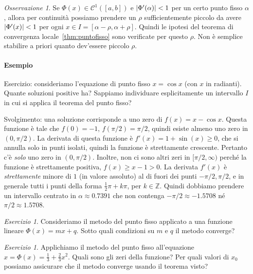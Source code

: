 \documentclass[a4paper]{report}
\DeclarePairedDelimiter{\abs}{\lvert}{\rvert}
\theoremstyle{definiton}
\theoremstyle{remark}
\newtheorem{remark}[theorem]{Osservazione}
\newtheorem{esercizio}[theorem]{Esercizio}
\begin{document}
\begin{remark} \label{oss:corpuntofisso}
Se $\Phi(x) \in \mathcal{C}^1([a,b])$ e $\abs{\Phi'(\alpha)} < 1$ per un certo punto fisso $\alpha$, allora per continuità possiamo prendere un $\rho$ sufficientemente piccolo da avere $\abs{\Phi'(x)} < 1$ per ogni $x \in I = [\alpha - \rho, \alpha + \rho]$. Quindi le ipotesi del teorema di convergenza locale~\ref{thm:puntofisso} sono verificate per questo $\rho$. Non è semplice stabilire a priori quanto dev'essere piccolo $\rho$.
\end{remark}

\paragraph{Esempio}

Esercizio: consideriamo l'equazione di punto fisso $x = \cos x$ (con $x$ in radianti). Quante soluzioni positive ha? Sappiamo individuare esplicitamente un intervallo $I$ in cui si applica il teorema del punto fisso?


Svolgimento: una soluzione corrisponde a uno zero di $f(x) = x - \cos x$. Questa funzione è tale che $f(0) = -1$, $f(\pi/2) = \pi/2$, quindi esiste almeno uno zero in $(0,\pi/2)$. La derivata di questa funzione è $f'(x) = 1 + \sin(x) \geq 0$, che si annulla solo in punti isolati, quindi la funzione è strettamente crescente. Pertanto c'è \emph{solo} uno zero in $(0,\pi/2)$. Inoltre, non ci sono altri zeri in $[\pi/2, \infty)$ perché la funzione è strettamente positiva, $f(x) \geq x - 1 > 0$. La derivata $f'(x)$ è \emph{strettamente} minore di $1$ (in valore assoluto) al di fuori dei punti $-\pi/2, \pi/2$, e in generale tutti i punti della forma $\frac12 \pi + k\pi$, per $k\in\mathbb{Z}$. Quindi dobbiamo prendere un intervallo centrato in $\alpha \approx 0.7391$ che non contenga $-\pi/2 \approx -1.5708$ né $\pi/2 \approx 1.5708$.

\begin{esercizio}
    Consideriamo il metodo del punto fisso applicato a una funzione lineare $\Phi(x) = mx + q$. Sotto quali condizioni su $m$ e $q$ il metodo converge?
\end{esercizio}
\begin{esercizio}
    Applichiamo il metodo del punto fisso all'equazione $x = \Phi(x) = \frac13 + \frac23 x^2$. Quali sono gli zeri della funzione? Per quali valori di $x_0$ possiamo assicurare che il metodo converge usando il teorema visto?
\end{esercizio}
\end{document}
